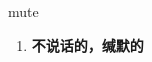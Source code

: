 
\begin{frame}
{\huge mute}
\begin{center}
\begin{enumerate}\Large
  \item \textbf{不说话的，缄默的}
\end{enumerate}
\end{center}
\end{frame}

